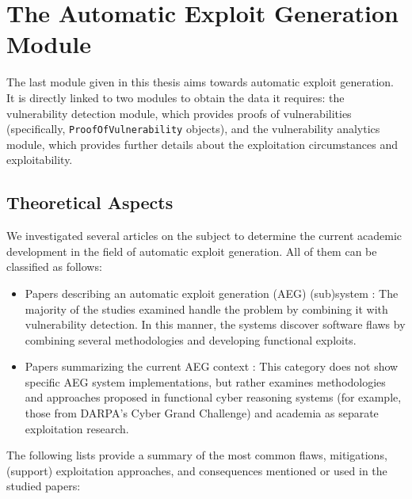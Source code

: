 \documentclass[../main.tex]{subfiles}
\begin{document}
\hypertarget{automatic-exploit-generation-module}{%
  \chapter{The Automatic Exploit Generation
    Module}\label{automatic-exploit-generation-module}}

The last module \cite{aeg_module_repo} given in this thesis aims towards automatic exploit generation.
It is directly linked to two modules to obtain the data it requires: the
vulnerability detection module, which provides proofs of vulnerabilities
(specifically, \texttt{ProofOfVulnerability} objects), and the vulnerability
analytics module, which provides further details about the exploitation
circumstances and exploitability.

\hypertarget{theoretical-aspects}{%
  \section{Theoretical Aspects}\label{theoretical-aspects}}

We investigated several articles on the subject to determine the current
academic development in the field of automatic exploit generation. All of them
can be classified as follows:

\begin{itemize}
  \tightlist
  \item
        Papers describing an automatic exploit generation (AEG) (sub)system \cite{aeg} \cite{mayhem_paper} \cite{bop} \cite{bof_aeg}:
        The majority of the studies examined handle the problem by combining
        it with vulnerability detection. In this manner, the systems discover
        software flaws by combining several methodologies and developing
        functional exploits.
  \item
        Papers summarizing the current AEG context \cite{crs_aeg_survey} \cite{alphahacking} \cite{code_reuse_survey}:
        This category does not show specific AEG system implementations, but
        rather examines methodologies and approaches proposed in functional
        cyber reasoning systems (for example, those from DARPA's Cyber Grand
        Challenge) and academia as separate exploitation research.
\end{itemize}

The following lists provide a summary of the most common flaws, mitigations,
(support) exploitation approaches, and consequences mentioned or used in the
studied papers:
\end{document}
